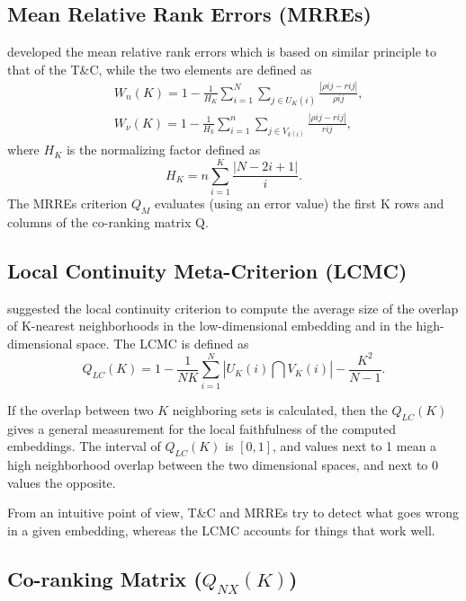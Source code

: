 \documentclass[11pt,a4paper,]{article}
\begin{document}
\hypertarget{mean-relative-rank-errors-mrres}{%
\subsection{Mean Relative Rank Errors (MRREs)}\label{mean-relative-rank-errors-mrres}}

\textcite{Lee2008-cx} developed the mean relative rank errors which is based on similar principle to that of the T\&C, while the two elements are defined as
\[
\begin{aligned}
&W_{n}(K)=1-\frac{1}{H_{K}} \sum_{i=1}^{N} \sum_{j \in U_{K}(i)} \frac{|\rho{ij}-r{ij}|}{\rho{ij}}, \\
&W_{\nu}(K)=1-\frac{1}{H_{k}} \sum_{i=1}^{n} \sum_{j \in V_{k(i)}} \frac{|\rho{ij}-r{ij}|}{r{ij}},
\end{aligned}
\]
where \(H_K\) is the normalizing factor defined as
\[
H_{K}=n \sum_{i=1}^{K} \frac{|N-2 i+1|}{i}.
\]
The MRREs criterion \(Q_M\) evaluates (using an error value) the first K rows and columns of the co-ranking matrix \(\mathrm{Q}\).

\hypertarget{local-continuity-meta-criterion-lcmc}{%
\subsection{Local Continuity Meta-Criterion (LCMC)}\label{local-continuity-meta-criterion-lcmc}}

\textcite{Chen2009-su} suggested the local continuity criterion to compute the average size of the overlap of K-nearest neighborhoods in the low-dimensional embedding and in the high-dimensional space. The LCMC is defined as
\[
Q_{LC}(K)=1-\frac{1}{N K} \sum_{i=1}^{N}\left| U_K(i) \bigcap V_K(i) \right|-\frac{K^{2}}{N-1}.
\]

If the overlap between two \(K\) neighboring sets is calculated, then the \(Q_{LC}(K)\) gives a general measurement for the local faithfulness of the computed embeddings. The interval of \(Q_{LC}(K)\) is \([0,1]\), and values next to 1 mean a high neighborhood overlap between the two dimensional spaces, and next to 0 values the opposite.

From an intuitive point of view, T\&C and MRREs try to detect what goes wrong in a given embedding, whereas the LCMC accounts for things that work well.

\hypertarget{co-ranking-matrix-q_nxk}{%
\subsection{\texorpdfstring{Co-ranking Matrix (\(Q_{NX}(K)\))}{Co-ranking Matrix (Q\_\{NX\}(K))}}\label{co-ranking-matrix-q_nxk}}
\end{document}
